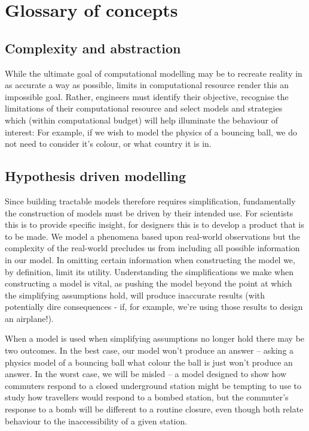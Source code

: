 \section{Glossary of concepts}

\subsection{Complexity and abstraction}

While the ultimate goal of computational modelling
may be to recreate reality in as accurate a way as possible, limits in
computational resource render this an impossible goal. Rather, engineers must
identify their objective, recognise the limitations of their computational
resource and select models and strategies which (within computational budget)
will help illuminate the behaviour of interest: For example, if we wish to
model the physics of a bouncing ball, we do not need to consider it’s colour,
or what country it is in.

\subsection{Hypothesis driven modelling}

Since building tractable models therefore requires
simplification, fundamentally the construction of models must be driven by
their intended use. For scientists this is to provide specific insight, for
designers this is to develop a product that is to be made. We model a phenomena
based upon real-world observations but the complexity of the real-world
precludes us from including all possible information in our model. In omitting
certain information when constructing the model we, by definition, limit its
utility. Understanding the simplifications we make when constructing a model is
vital, as pushing the model beyond the point at which the simplifying
assumptions hold, will produce inaccurate results (with potentially dire
consequences - if, for example, we’re using those results to design an
airplane!).

When a model is used when simplifying assumptions no longer hold there may be
two outcomes. In the best case, our model won’t produce an answer -- asking a
physics model of a bouncing ball what colour the ball is just won’t produce an
answer. In the worst case, we will be misled -- a model designed to show how
commuters respond to a closed underground station might be tempting to use to
study how travellers would respond to a bombed station, but the commuter’s
response to a bomb will be different to a routine closure, even though both
relate behaviour to the inaccessibility of a given station.

